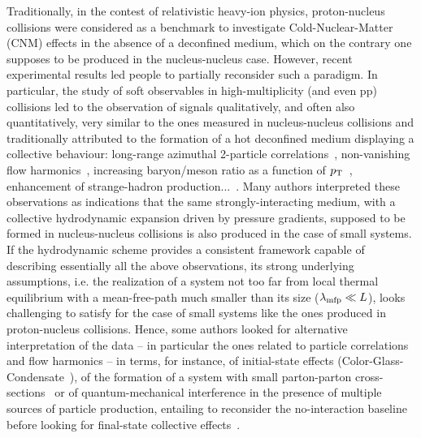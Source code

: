 Traditionally, in the contest of relativistic heavy-ion physics, proton-nucleus collisions were considered as a benchmark to investigate Cold-Nuclear-Matter (CNM) effects in the absence of a deconfined medium, which on the contrary one supposes to be produced in the nucleus-nucleus case. However, recent experimental results led people to partially reconsider such a paradigm. 
In particular, the study of soft observables in high-multiplicity \pPb (and even pp) collisions led to the observation of signals qualitatively, and often also quantitatively, very similar to the ones measured in nucleus-nucleus collisions and traditionally attributed to the formation of a hot deconfined medium displaying a collective behaviour: long-range azimuthal 2-particle correlations~\cite{Khachatryan:2010gv,CMS:2012qk,Abelev:2012ola,Aad:2012gla}, non-vanishing flow harmonics~\cite{ABELEV:2013wsa,Khachatryan:2015waa}, increasing baryon/meson ratio as a function of $p\sb{\scriptstyle\mathrm{T}}$~\cite{Abelev:2013haa}, enhancement of strange-hadron production...~\cite{Adam:2015vsf}. Many authors interpreted these observations as indications that the same strongly-interacting medium, with a collective hydrodynamic expansion driven by pressure gradients, supposed to be formed in nucleus-nucleus collisions is also produced in the case of small systems. If the hydrodynamic scheme provides a consistent framework capable of describing essentially all the above observations, its strong underlying assumptions, i.e. the realization of a system not too far from local thermal equilibrium with a mean-free-path much smaller than its size ($\lambda_{\rm mfp}\ll L$), looks challenging to satisfy for the case of small systems like the ones produced in proton-nucleus collisions. Hence, some authors looked for alternative interpretation of the data -- in particular the ones related to particle correlations and flow harmonics -- in terms, for instance, of initial-state effects (Color-Glass-Condensate~\cite{Dusling:2013qoz}), of the formation of a system with small parton-parton cross-sections~\cite{Bzdak:2014dia} or of quantum-mechanical interference in the presence of multiple sources of particle production, entailing to reconsider the no-interaction baseline before looking for final-state collective effects~\cite{Blok:2017pui}.

